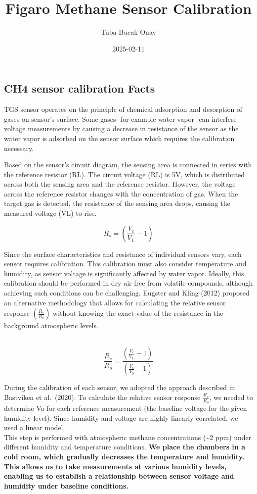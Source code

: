 \documentclass[
]{article}
\title{Figaro Methane Sensor Calibration}
\author{Tuba Bucak Onay}
\date{2025-02-11}
\begin{document}
\maketitle

\hypertarget{ch4-sensor-calibration-facts}{%
\subsection{CH4 sensor calibration
Facts}\label{ch4-sensor-calibration-facts}}

TGS sensor operates on the principle of chemical adsorption and
desorption of gases on sensor's surface. Some gases- for example water
vapor- can interfere voltage measurements by causing a decrease in
resistance of the sensor as the water vapor is adsorbed on the sensor
surface which requires the calibration necessary.

Based on the sensor's circuit diagram, the sensing area is connected in
series with the reference resistor (RL). The circuit voltage (RL) is 5V,
which is distributed across both the sensing area and the reference
resistor. However, the voltage across the reference resistor changes
with the concentration of gas. When the target gas is detected, the
resistance of the sensing area drops, causing the measured voltage (VL)
to rise.

\[R_s = \left(\frac{V_c}{V_L} - 1\right)\]

Since the surface characteristics and resistance of individual sensors
vary, each sensor requires calibration. This calibration must also
consider temperature and humidity, as sensor voltage is significantly
affected by water vapor. Ideally, this calibration should be performed
in dry air free from volatile compounds, although achieving such
conditions can be challenging. Eugster and Kling (2012) proposed an
alternative methodology that allows for calculating the relative sensor
response \(\left(\frac{R_s}{R_o}\right)\) without knowing the exact
value of the resistance in the background atmospheric levels.\\
\strut \\

\[\frac{R_s}{R_o} = \frac{\left(\frac{V_c}{V_L}- 1\right)}{\left(\frac{V_c}{V_0}-1\right)}\]

During the calibration of each sensor, we adopted the approach described
in Bastviken et al.~(2020). To calculate the relative sensor response
\(\frac{R_s}{R_o}\), we needed to determine Vo for each reference
measurement (the baseline voltage for the given humidity level). Since
humidity and voltage are highly linearly correlated, we used a linear
model.\\
This step is performed with atmospheric methane concentrations
(\textasciitilde2 ppm) under different humidity and temperature
conditions. \textbf{We place the chambers in a cold room, which
gradually decreases the temperature and humidity. This allows us to take
measurements at various humidity levels, enabling us to establish a
relationship between sensor voltage and humidity under baseline
conditions.}\\
\end{document}
